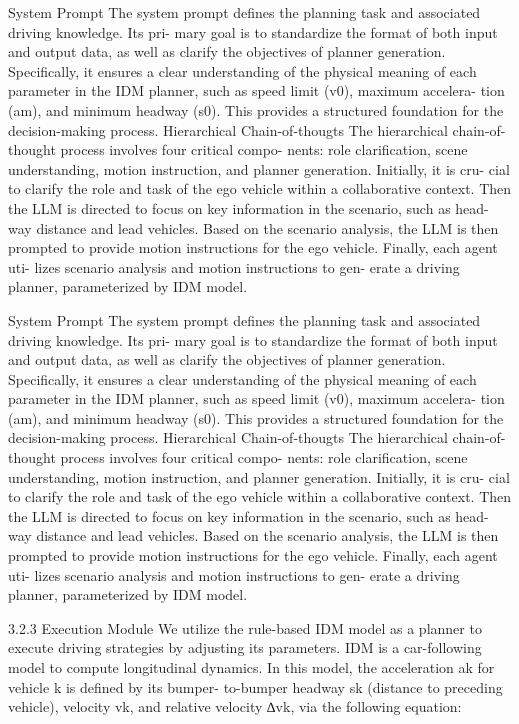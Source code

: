 \documentclass[12pt]{article}
\begin{document}
System Prompt The system prompt defines the
planning task and associated driving knowledge. Its pri-
mary goal is to standardize the format of both input and
output data, as well as clarify the objectives of planner
generation. Specifically, it ensures a clear understanding
of the physical meaning of each parameter in the IDM
planner, such as speed limit (v0), maximum accelera-
tion (am), and minimum headway (s0). This provides a
structured foundation for the decision-making process.
Hierarchical Chain-of-thougts The hierarchical
chain-of-thought process involves four critical compo-
nents: role clarification, scene understanding, motion
instruction, and planner generation. Initially, it is cru-
cial to clarify the role and task of the ego vehicle within
a collaborative context. Then the LLM is directed to
focus on key information in the scenario, such as head-
way distance and lead vehicles. Based on the scenario
analysis, the LLM is then prompted to provide motion
instructions for the ego vehicle. Finally, each agent uti-
lizes scenario analysis and motion instructions to gen-
erate a driving planner, parameterized by IDM model.


System Prompt The system prompt defines the
planning task and associated driving knowledge. Its pri-
mary goal is to standardize the format of both input and
output data, as well as clarify the objectives of planner
generation. Specifically, it ensures a clear understanding
of the physical meaning of each parameter in the IDM
planner, such as speed limit (v0), maximum accelera-
tion (am), and minimum headway (s0). This provides a
structured foundation for the decision-making process.
Hierarchical Chain-of-thougts The hierarchical
chain-of-thought process involves four critical compo-
nents: role clarification, scene understanding, motion
instruction, and planner generation. Initially, it is cru-
cial to clarify the role and task of the ego vehicle within
a collaborative context. Then the LLM is directed to
focus on key information in the scenario, such as head-
way distance and lead vehicles. Based on the scenario
analysis, the LLM is then prompted to provide motion
instructions for the ego vehicle. Finally, each agent uti-
lizes scenario analysis and motion instructions to gen-
erate a driving planner, parameterized by IDM model.


3.2.3 Execution Module We utilize the rule-based
IDM model as a planner to execute driving strategies by
adjusting its parameters. IDM is a car-following model
to compute longitudinal dynamics. In this model, the
acceleration ak for vehicle k is defined by its bumper-
to-bumper headway sk (distance to preceding vehicle),
velocity vk, and relative velocity ∆vk, via the following
equation:
\end{document}
